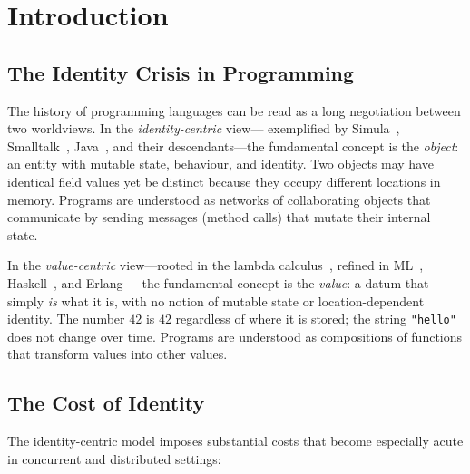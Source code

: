 \documentclass[11pt]{article}
\theoremstyle{definition}
\theoremstyle{remark}
\begin{document}
\newpage
\tableofcontents
\newpage

\section{Introduction}
\label{sec:intro}

\subsection{The Identity Crisis in Programming}

The history of programming languages can be read as a long negotiation
between two worldviews.  In the \emph{identity-centric} view---
exemplified by Simula~\cite{dahl1966simula}, Smalltalk~\cite{kay1993early},
Java~\cite{gosling2000java}, and their descendants---the fundamental
concept is the \emph{object}: an entity with mutable state, behaviour,
and identity.  Two objects may have identical field values yet be
distinct because they occupy different locations in memory.  Programs
are understood as networks of collaborating objects that communicate by
sending messages (method calls) that mutate their internal state.

In the \emph{value-centric} view---rooted in the lambda
calculus~\cite{church1936unsolvable}, refined in ML~\cite{milner1978theory},
Haskell~\cite{jones2003haskell}, and Erlang~\cite{armstrong2007programming}---the
fundamental concept is the \emph{value}: a datum that simply \emph{is}
what it is, with no notion of mutable state or location-dependent
identity.  The number $42$ is $42$ regardless of where it is stored;
the string \texttt{"hello"} does not change over time.  Programs are
understood as compositions of functions that transform values into
other values.

\subsection{The Cost of Identity}

The identity-centric model imposes substantial costs that become
especially acute in concurrent and distributed settings:
\end{document}
